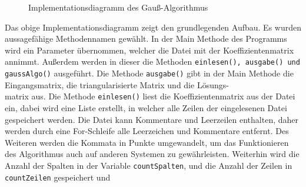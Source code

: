 \documentclass[a4paper, 12pt]{report}
\newcommand{\GA}{Gauß-Algorithmus }
\begin{document}
\begin{figure}
    \label{IMpl}
\begin{center}
{\ttfamily
{}
}
\caption{Implementationsdiagramm des \GA}
\end{center}
\end{figure}
Das obige Implementationsdiagramm zeigt den grundlegenden Aufbau.
Es wurden aussagefähige Methodennamen gewählt.
In der Main Methode des Programms wird ein Parameter übernommen,
welcher die Datei mit der Koeffizientenmatrix annimmt. Außerdem werden
in dieser die Methoden \texttt{einlesen(), ausgabe() und gaussAlgo()} ausgeführt.
Die Methode \texttt{ausgabe()} gibt in der Main Methode die Eingangsmatrix, die triangularisierte Matrix
und die Lösungs-\\matrix aus. \newline
Die Methode \texttt{einlesen()} liest die Koeffizientenmatrix aus der Datei ein,
dabei wird eine Liste erstellt, in welcher alle Zeilen der eingelesenen Datei gespeichert werden.
Die Datei kann Kommentare und Leerzeilen enthalten, daher werden durch eine For-Schleife alle Leerzeichen und Kommentare entfernt.
Des Weiteren werden die Kommata in Punkte umgewandelt,
um das Funktionieren des Algorithmus auch auf anderen Systemen zu gewährleisten.
Weiterhin wird die Anzahl der Spalten in der Variable \texttt{countSpalten},
und die Anzahl der Zeilen in \texttt{countZeilen} gespeichert und
\end{document}
